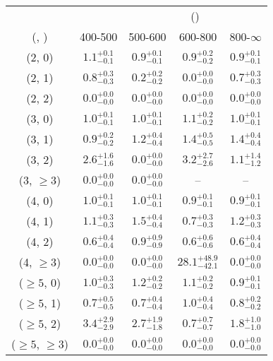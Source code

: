 \begin{table}[h!]
\tiny
\centering
{}
\begin{tabular}
{ccccc}
	\hline\hline
&	& \multicolumn{4}{c}{\scalht (\gev)} \\ 
	 (\njet,  \nb) & 400-500 & 500-600 & 600-800 & 800-$\infty$ \\ [0.8ex] 
\hline
	(2, 0) & $1.1^{+ 0.1 }_{- 0.1 }$ & $0.9^{+ 0.1 }_{- 0.1 }$ & $0.9^{+ 0.2 }_{- 0.2 }$ & $0.9^{+ 0.1 }_{- 0.1 }$ \\[0.5ex] 
	(2, 1) & $0.8^{+ 0.3 }_{- 0.3 }$ & $0.2^{+ 0.2 }_{- 0.2 }$ & $0.0^{+ 0.0 }_{- 0.0 }$ & $0.7^{+ 0.3 }_{- 0.3 }$ \\[0.5ex] 
	(2, 2) & $0.0^{+ 0.0 }_{- 0.0 }$ & $0.0^{+ 0.0 }_{- 0.0 }$ & $0.0^{+ 0.0 }_{- 0.0 }$ & $0.0^{+ 0.0 }_{- 0.0 }$ \\[0.5ex] 
	(3, 0) & $1.0^{+ 0.1 }_{- 0.1 }$ & $1.0^{+ 0.1 }_{- 0.1 }$ & $1.1^{+ 0.2 }_{- 0.2 }$ & $1.0^{+ 0.1 }_{- 0.1 }$ \\[0.5ex] 
	(3, 1) & $0.9^{+ 0.2 }_{- 0.2 }$ & $1.2^{+ 0.4 }_{- 0.4 }$ & $1.4^{+ 0.5 }_{- 0.5 }$ & $1.4^{+ 0.4 }_{- 0.4 }$ \\[0.5ex] 
	(3, 2) & $2.6^{+ 1.6 }_{- 1.6 }$ & $0.0^{+ 0.0 }_{- 0.0 }$ & $3.2^{+ 2.7 }_{- 2.6 }$ & $1.1^{+ 1.4 }_{- 1.2 }$ \\[0.5ex] 
	(3, $\ge3$) & $0.0^{+ 0.0 }_{- 0.0 }$ & $0.0^{+ 0.0 }_{- 0.0 }$ & -- & -- \\[0.5ex] 
	(4, 0) & $1.0^{+ 0.1 }_{- 0.1 }$ & $1.0^{+ 0.1 }_{- 0.1 }$ & $0.9^{+ 0.1 }_{- 0.1 }$ & $0.9^{+ 0.1 }_{- 0.1 }$ \\[0.5ex] 
	(4, 1) & $1.1^{+ 0.3 }_{- 0.3 }$ & $1.5^{+ 0.4 }_{- 0.4 }$ & $0.7^{+ 0.3 }_{- 0.3 }$ & $1.2^{+ 0.3 }_{- 0.3 }$ \\[0.5ex] 
	(4, 2) & $0.6^{+ 0.4 }_{- 0.4 }$ & $0.9^{+ 0.9 }_{- 0.9 }$ & $0.6^{+ 0.6 }_{- 0.6 }$ & $0.6^{+ 0.4 }_{- 0.4 }$ \\[0.5ex] 
	(4, $\ge3$) & $0.0^{+ 0.0 }_{- 0.0 }$ & $0.0^{+ 0.0 }_{- 0.0 }$ & $28.1^{+ 48.9 }_{- 42.1 }$ & $0.0^{+ 0.0 }_{- 0.0 }$ \\[0.5ex] 
	($\ge5$, 0) & $1.0^{+ 0.3 }_{- 0.3 }$ & $1.2^{+ 0.2 }_{- 0.2 }$ & $1.1^{+ 0.2 }_{- 0.2 }$ & $0.9^{+ 0.1 }_{- 0.1 }$ \\[0.5ex] 
	($\ge5$, 1) & $0.7^{+ 0.5 }_{- 0.5 }$ & $0.7^{+ 0.4 }_{- 0.4 }$ & $1.0^{+ 0.4 }_{- 0.4 }$ & $0.8^{+ 0.2 }_{- 0.2 }$ \\[0.5ex] 
	($\ge5$, 2) & $3.4^{+ 2.9 }_{- 2.9 }$ & $2.7^{+ 1.9 }_{- 1.8 }$ & $0.7^{+ 0.7 }_{- 0.7 }$ & $1.8^{+ 1.0 }_{- 1.0 }$ \\[0.5ex] 
	($\ge5$, $\ge3$) & $0.0^{+ 0.0 }_{- 0.0 }$ & $0.0^{+ 0.0 }_{- 0.0 }$ & $0.0^{+ 0.0 }_{- 0.0 }$ & $0.0^{+ 0.0 }_{- 0.0 }$ \\[0.5ex] 
	\hline
	\hline
\end{tabular}
\end{table}
